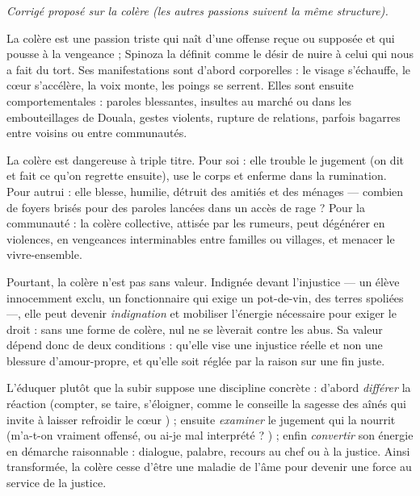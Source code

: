 \documentclass[11pt]{article}
\begin{document}
\begin{corrige}

\emph{Corrigé proposé sur la colère (les autres passions suivent la même structure).}

La colère est une passion triste qui naît d'une offense reçue ou supposée et qui pousse à la vengeance ; Spinoza la définit comme le désir de nuire à celui qui nous a fait du tort. Ses manifestations sont d'abord corporelles : le visage s'échauffe, le cœur s'accélère, la voix monte, les poings se serrent. Elles sont ensuite comportementales : paroles blessantes, insultes au marché ou dans les embouteillages de Douala, gestes violents, rupture de relations, parfois bagarres entre voisins ou entre communautés.

La colère est dangereuse à triple titre. Pour soi : elle trouble le jugement (on dit et fait ce qu'on regrette ensuite), use le corps et enferme dans la rumination. Pour autrui : elle blesse, humilie, détruit des amitiés et des ménages — combien de foyers brisés pour des paroles lancées dans un accès de rage ? Pour la communauté : la colère collective, attisée par les rumeurs, peut dégénérer en violences, en vengeances interminables entre familles ou villages, et menacer le vivre-ensemble.

Pourtant, la colère n'est pas sans valeur. Indignée devant l'injustice — un élève innocemment exclu, un fonctionnaire qui exige un pot-de-vin, des terres spoliées —, elle peut devenir \emph{indignation} et mobiliser l'énergie nécessaire pour exiger le droit : sans une forme de colère, nul ne se lèverait contre les abus. Sa valeur dépend donc de deux conditions : qu'elle vise une injustice réelle et non une blessure d'amour-propre, et qu'elle soit réglée par la raison sur une fin juste.

L'éduquer plutôt que la subir suppose une discipline concrète : d'abord \emph{différer} la réaction (compter, se taire, s'éloigner, comme le conseille la sagesse des aînés qui invite à \guillemotleft laisser refroidir le cœur \guillemotright{}) ; ensuite \emph{examiner} le jugement qui la nourrit (\guillemotleft m'a-t-on vraiment offensé, ou ai-je mal interprété ? \guillemotright) ; enfin \emph{convertir} son énergie en démarche raisonnable : dialogue, palabre, recours au chef ou à la justice. Ainsi transformée, la colère cesse d'être une maladie de l'âme pour devenir une force au service de la justice.

\end{corrige}
\end{document}
